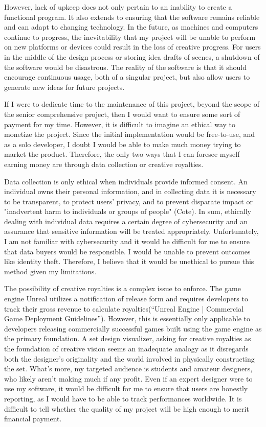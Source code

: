 \documentclass[10pt,twocolumn]{article}
\begin{document}
However, lack of upkeep does not only pertain to an inability to create a functional program. It also extends to ensuring that the software remains reliable and can adapt to changing technology. In the future, as machines and computers continue to progress, the inevitability that my project will be unable to perform on new platforms or devices could result in the loss of creative progress. For users in the middle of the design process or storing idea drafts of scenes, a shutdown of the software would be disastrous. The reality of the software is that it should encourage continuous usage, both of a singular project, but also allow users to generate new ideas for future projects. 

If I were to dedicate time to the maintenance of this project, beyond the scope of the senior comprehensive project, then I would want to ensure some sort of payment for my time. However, it is difficult to imagine an ethical way to monetize the project. Since the initial implementation would be free-to-use, and as a solo developer, I doubt I would be able to make much money trying to market the product. Therefore, the only two ways that I can foresee myself earning money are through data collection or creative royalties. 

Data collection is only ethical when individuals provide informed consent. An individual owns their personal information, and in collecting data it is necessary to be transparent, to protect users' privacy, and to prevent disparate impact or "inadvertent harm to individuals or groups of people" (Cote). In sum, ethically dealing with individual data requires a certain degree of cybersecurity and an assurance that sensitive information will be treated appropriately. Unfortunately, I am not familiar with cybersecurity and it would be difficult for me to ensure that data buyers would be responsible. I would be unable to prevent outcomes like identity theft. Therefore, I believe that it would be unethical to pursue this method given my limitations. 

The possibility of creative royalties is a complex issue to enforce. The game engine Unreal utilizes a notification of release form and requires developers to track their gross revenue to calculate royalties(“Unreal Engine | Commercial Game Deployment Guidelines”). However, this is essentially only applicable to developers releasing commercially successful games built using the game engine as the primary foundation. A set design visualizer, asking for creative royalties as the foundation of creative vision seems an inadequate analogy as it disregards both the designer's originality and the world involved in physically constructing the set. What's more, my targeted audience is students and amateur designers, who likely aren't making much if any profit. Even if an expert designer were to use my software, it would be difficult for me to ensure that users are honestly reporting, as I would have to be able to track performances worldwide. It is difficult to tell whether the quality of my project will be high enough to merit financial payment.
\end{document}
